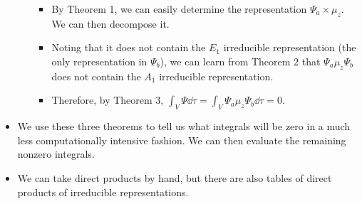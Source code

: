 \documentclass[../notes.tex]{subfiles}
\begin{document}
\begin{itemize}
\begin{enumerate}
\begin{itemize}
            \item By Theorem 1, we can easily determine the representation $\Psi_a\times\mu_z$. We can then decompose it.
            \item Noting that it does not contain the $E_1$ irreducible representation (the only representation in $\Psi_b$), we can learn from Theorem 2 that $\Psi_a\mu_z\Psi_b$ does not contain the $A_1$ irreducible representation.
            \item Therefore, by Theorem 3, $\int_V\Psi\dd{\tau}=\int_V\Psi_a\mu_z\Psi_b\dd{\tau}=0$.
        \end{itemize}
    \end{enumerate}
    \item We use these three theorems to tell us what integrals will be zero in a much less computationally intensive fashion. We can then evaluate the remaining nonzero integrals.
    \item We can take direct products by hand, but there are also tables of direct products of irreducible representations.
\end{itemize}
\end{document}
